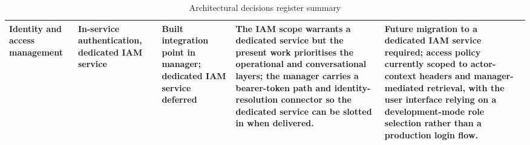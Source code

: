\begin{table}[H]
\begin{tabularx}{\textwidth}{|p{2.0cm}|p{2.8cm}|p{2.8cm}|>{\RaggedRight\arraybackslash}X|>{\RaggedRight\arraybackslash}X|}
Identity and access management & In-service authentication, dedicated IAM service & Built integration point in manager; dedicated IAM service deferred & The IAM scope warrants a dedicated service but the present work prioritises the operational and conversational layers; the manager carries a bearer-token path and identity-resolution connector so the dedicated service can be slotted in when delivered. & Future migration to a dedicated IAM service required; access policy currently scoped to actor-context headers and manager-mediated retrieval, with the user interface relying on a development-mode role selection rather than a production login flow. \\ \hline
\end{tabularx}
\caption{Architectural decisions register summary}
\label{tab:decisions}
\end{table}
